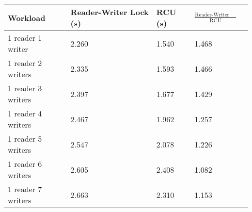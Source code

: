 \begin{tabular}{|l|l|l|l|l|}
\hline Workload &Reader-Writer Lock (s) & RCU (s) & $\frac{\mbox{Reader-Writer Lock}}{\mbox{RCU}} $ \\
\hline 1 reader 1 writer & 2.260 & 1.540&1.468\\
\hline 1 reader 2 writers & 2.335 & 1.593&1.466\\
\hline 1 reader 3 writers & 2.397 & 1.677&1.429\\
\hline 1 reader 4 writers & 2.467 & 1.962&1.257\\
\hline 1 reader 5 writers & 2.547 & 2.078&1.226\\
\hline 1 reader 6 writers & 2.605 & 2.408&1.082\\
\hline 1 reader 7 writers & 2.663 & 2.310&1.153\\
\hline
\end{tabular}
